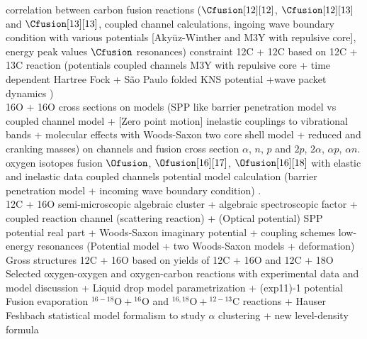 \documentclass[openany]{book}
\begin{document}
correlation between carbon fusion reactions ($\Cfusion[12][12]$, $\Cfusion[12][13]$ and  $\Cfusion[13][13]$, coupled channel calculations, ingoing wave boundary condition with various potentials [Akyüz-Winther and M3Y with repulsive core], energy peak values $\Cfusion$ resonances) \cite{notani_esbensen_fang_bucher_davies_jiang_lamm_lin_ma_martin_et_2012}
constraint 12C + 12C based on 12C + 13C reaction (potentials coupled channels M3Y with repulsive core + time dependent Hartree Fock + São Paulo folded KNS potential +wave packet dynamics ) \cite{zhang_wang_tudor_bucher_burducea_chen_chen_chesneanu_chilug_gasques_et_2020} \\

16O + 16O cross sections on models (SPP like barrier penetration model vs coupled channel model + [Zero point motion] inelastic couplings to vibrational bands + molecular effects with Woods-Saxon two core shell model + reduced and cranking masses) \cite{duarte_gasques_oliveira_zagatto_chamon_medina_added_seale_alcantara-nunez_rossi_et_2015} on channels and fusion cross section 
\cite{kuronen_keinonen_tikkanen_1987} $\alpha$, $n$, $p$ and $2p$, $2\alpha$, $\alpha p$, $\alpha n$. \\

oxygen isotopes fusion $\Ofusion$, $\Ofusion[16][17]$, $\Ofusion[16][18]$ with elastic and inelastic data \cite{thomas_chen_hinds_meredith_olson_1986}
coupled channels potential model calculation (barrier penetration model + incoming wave boundary condition) \cite{guimin_deji_xiaowu_1992}. \\

12C + 16O semi-microscopic algebraic cluster  + algebraic spectroscopic factor + coupled reaction channel (scattering reaction) + (Optical potential) SPP potential real part + Woods-Saxon imaginary potential + coupling schemes  \cite{ferreira_lubian_linares_ermamatov_yepez-martinez_hess_2019}
low-energy resonances (Potential model + two Woods-Saxon models + deformation) \cite{torilov_maltsev_zherebchevsky_2021} \\

Gross structures 12C + 16O based on yields of 12C + 16O and 12C + 18O \cite{chan_bohn_vandenbosch_sielemann_cramer_bernhardt_bhang_chiang_1979} \\

Selected oxygen-oxygen and oxygen-carbon reactions with experimental data and model discussion + Liquid drop model parametrization + (exp11)-1 potential  \cite{kovar_geesaman_braid_eisen_henning_ophel_paul_rehm_sanders_sperr_et_1979}
Fusion evaporation $\mathrm{{}^{16-18}O + {}^{16}O}$ and $\mathrm{{}^{16, 18}O+ {}^{12-13}C}$ reactions + Hauser Feshbach statistical model formalism to study $\alpha$ clustering + new level-density formula \cite{wang_ren_bai_2020} \\
\end{document}

